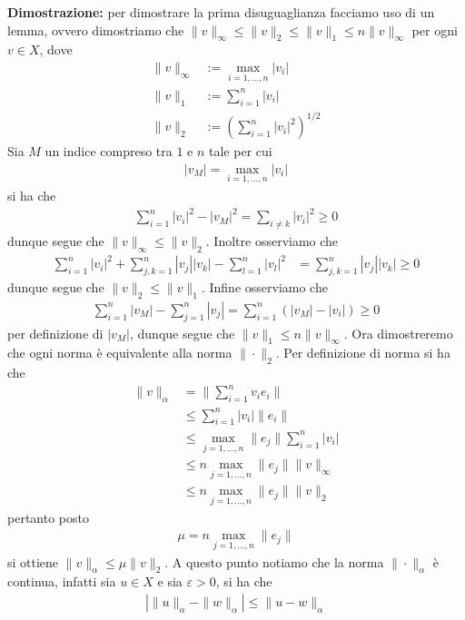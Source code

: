 \documentclass{article}
\numberwithin{equation}{subsection}
\begin{document}
\textbf{Dimostrazione:} per dimostrare la prima disuguaglianza facciamo uso di un lemma, ovvero dimostriamo che $\|v\|_\infty \leq \|v\|_2 \leq \|v\|_1 \leq n\|v\|_\infty$ per ogni $v \in X$, dove
\begin{align*}
    \|v\|_\infty &:= \max_{i = 1, \dots, n}|v_i|  \\
    \|v\|_1 &:= \sum_{i = 1}^n |v_i|  \\
    \|v\|_2 &:= \left(\sum_{i = 1}^n |v_i|^2\right)^{1/2} 
\end{align*}
Sia $M$ un indice compreso tra $1$ e $n$ tale per cui
\begin{gather*}
    |v_M| = \max_{i = 1, \dots, n}|v_i| 
\end{gather*}
si ha che
\begin{align*}
    \sum_{i = 1}^n|v_i|^2 - |v_M|^2 = \sum_{i \neq k}|v_i|^2 \geq 0 
\end{align*}
dunque segue che $\|v\|_\infty \leq \|v\|_2$. Inoltre osserviamo che
\begin{align*}
    \sum_{i = 1}^n |v_i|^2 + \sum_{j, k = 1}^n|v_j||v_k| - \sum_{l = 1}^n|v_l|^2 &= \sum_{j, k = 1}^n|v_j||v_k| \geq 0 
\end{align*}
dunque segue che $\|v\|_2 \leq \|v\|_1$. Infine osserviamo che
\begin{align*}
    \sum_{i = 1}^n|v_M| - \sum_{j = 1}^n|v_j| = \sum_{i = 1}^n(|v_M| - |v_i|) \geq 0 
\end{align*}
per definizione di $|v_M|$, dunque segue che $\|v\|_1 \leq n\|v\|_\infty$. Ora dimostreremo che ogni norma è equivalente alla norma $\|\cdot\|_2$. Per definizione di norma si ha che
\begin{align*}
    \|v\|_\alpha &= \|\sum_{i = 1}^n v_ie_i\|  \\
    &\leq \sum_{i = 1}^n|v_i|\|e_i\|  \\
    &\leq \max_{j = 1, \dots, n}\|e_j\|\sum_{i = 1}^n|v_i|  \\
    &\leq n\max_{j = 1, \dots, n}\|e_j\|\|v\|_\infty  \\
    &\leq n\max_{j = 1, \dots, n}\|e_j\|\|v\|_2 
\end{align*}
pertanto posto
\begin{gather*}
    \mu = n\max_{j = 1, \dots, n}\|e_j\| 
\end{gather*}
si ottiene $\|v\|_\alpha \leq \mu\|v\|_2$. A questo punto notiamo che la norma $\|\cdot\|_\alpha$ è continua, infatti sia $u \in X$ e sia $\varepsilon > 0$, si ha che
\begin{align*}
    |\|u\|_\alpha - \|w\|_\alpha| \leq \|u - w\|_\alpha 
\end{align*}
\end{document}
